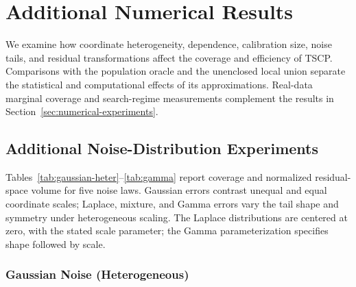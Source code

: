 
\begingroup
\color{blue}
\setlength{\emergencystretch}{2em}

\section{Additional Numerical Results}
\label{app:additional-experiments}

We examine how coordinate heterogeneity, dependence, calibration size, noise
tails, and residual transformations affect the coverage and efficiency of
TSCP. Comparisons with the population oracle and the unenclosed local union
separate the statistical and computational effects of its approximations.
Real-data marginal coverage and search-regime measurements complement the
results in Section~\ref{sec:numerical-experiments}.

\subsection{Additional Noise-Distribution Experiments}
\label{app:additional-distribution-experiments}
\label{app:simulations}

Tables~\ref{tab:gaussian-heter}--\ref{tab:gamma} report coverage and
normalized residual-space volume for five noise laws. Gaussian errors
contrast unequal and equal coordinate scales; Laplace, mixture, and Gamma
errors vary the tail shape and symmetry under heterogeneous scaling.
The Laplace distributions are centered at zero, with the stated scale
parameter; the Gamma parameterization specifies shape followed by scale.

\subsubsection*{Gaussian Noise (Heterogeneous)}

\begin{table}[H]
    \centering
    
    \caption{Performance with $d=10$ outcome variables, as in
    Figure~\ref{fig:gaussian-heter}. Results are averaged over 200 repetitions,
    with one standard deviation in parentheses. The target coverage is $0.9$;
    estimates below this target are highlighted in \textcolor{red}{red}.
    Bold values indicate the smallest mean residual-space volume among
    TSCP, Point CHR, and Unscaled Max. TSCP has the smallest volume among
    these methods in the displayed settings.}
    \label{tab:gaussian-heter}
\end{table}


